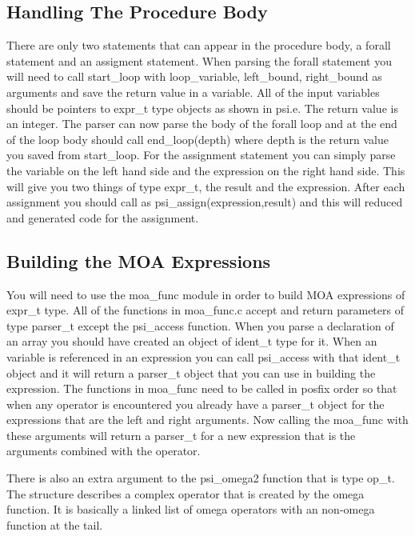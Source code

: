 \subsection{Handling The Procedure Body}

  There are only two statements that can appear in the procedure body, a
forall statement and an assigment statement.  When parsing the forall statement
you will need to call 
start\_loop with loop\_variable, left\_bound, right\_bound as arguments and
save the return value in a variable.  All of the input variables should be 
pointers to expr\_t type objects as shown in psi.e.  The return value is an
integer.  The parser can now parse the body of the forall loop and at the end
of the loop body should call end\_loop(depth) where depth is the return value
you saved from start\_loop.  For the assignment statement you can simply
parse the variable on the left hand side and the expression on the right hand
side.  This will give you two things of type expr\_t, the result and the
expression.  After each assignment you should call as
psi\_assign(expression,result) and this will reduced and generated code for the
assignment.

\subsection{Building the MOA Expressions}

  You will need to use the moa\_func module in order to build MOA expressions
of expr\_t type.  All of the functions in moa\_func.c accept and return
parameters of type parser\_t except the psi\_access function.  When you
parse a declaration of an array you should have created an object of ident\_t
type for it.  When an variable is referenced in an expression you can call
psi\_access with that ident\_t object and it will return a parser\_t object that
you can use in building the expression.  The functions in moa\_func need to be
called in posfix order so that when any operator is encountered you already 
have a parser\_t object for the expressions that are the left and right
arguments.  Now calling the moa\_func with these arguments will return a 
parser\_t for a new expression that is the arguments combined with the operator.

  There is also an extra argument to the psi\_omega2 function that is type
op\_t.  The structure describes a complex operator that is created by the 
omega function.  It is basically a linked list of omega operators with an
non-omega function at the tail.


